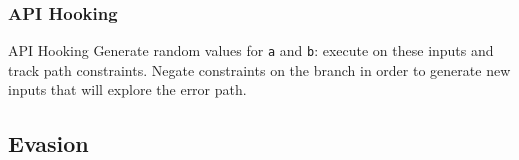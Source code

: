 \documentclass[compress]{beamer}
\begin{document}
\begin{frame}
    \frametitle{API Hooking}
	
	    \begin{beamerboxesrounded}[shadow=true]{API Hooking}
    Generate random values for {\tt a} and {\tt b}: execute on these inputs and track path constraints. Negate constraints on the branch in order to generate new inputs that will explore the error path.
    \end{beamerboxesrounded}

\end{frame}

\subsection{Evasion}
\end{document}
